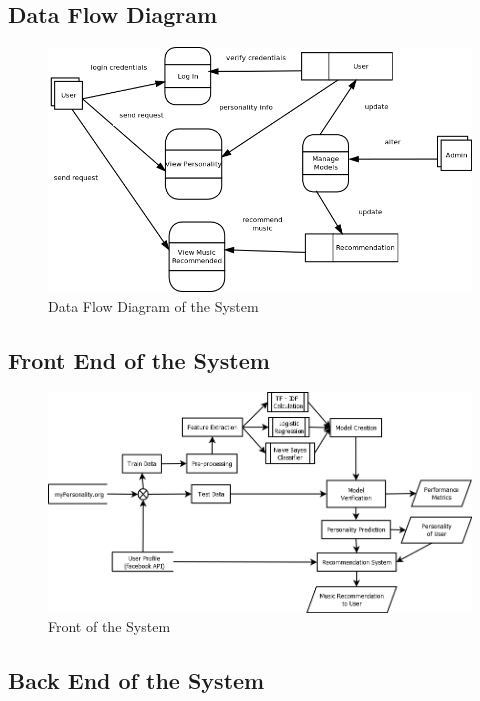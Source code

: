 \subsection{Data Flow Diagram}
\begin{figure}[!ht]
\centering
\includegraphics[width = 16 cm]{fig/dfd.png}
\caption{Data Flow Diagram of the System}
\label{fig:dfd}
\end{figure}

\newpage
\subsection{Front End of the System}
\begin{figure}[!ht]
\centering
\includegraphics[width = 16 cm]{fig/System.png}
\caption{Front of the System}
\label{fig:front}
\end{figure}

\newpage
\subsection{Back End of the System}

